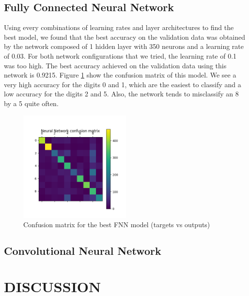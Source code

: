 \documentclass[letterpaper, 10 pt, conference]{ieeeconf}  %
\begin{document}
\subsection{Fully Connected Neural Network}
Using every combinations of learning rates and layer architectures to find the best model, we found that the best accuracy on the validation data was obtained by the network composed of 1 hidden layer with 350 neurons and a learning rate of 0.03. For both network configurations that we tried, the learning rate of 0.1 was too high. The best accuracy achieved on the validation data using this network is 0.9215. Figure \ref{fig:fnnconf} show the confusion matrix of this model. We see a very high accuracy for the digits 0 and 1, which are the easiest to classify and a low accuracy for the digits 2 and 5. Also, the network tends to misclassify an 8 by a 5 quite often.

\begin{figure}[h]
	\begin{center}
			\includegraphics[width=0.5\textwidth]{figures/fnn_conf.png}  %
		\caption{Confusion matrix for the best FNN model (targets vs outputs)}
		\label{fig:fnnconf}
	\end{center}
\end{figure}


\subsection{Convolutional Neural Network}


\section{DISCUSSION}
\end{document}
